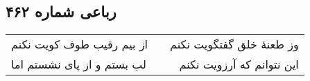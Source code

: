 \begin{center}
\section*{رباعی شماره ۴۶۲}
\label{sec:sh462}
\begin{longtable}{l p{0.5cm} r}
از بیم رقیب طوف کویت نکنم
&&
وز طعنهٔ خلق گفتگویت نکنم
\\
لب بستم و از پای نشستم اما
&&
این نتوانم که آرزویت نکنم
\\
\end{longtable}
\end{center}
